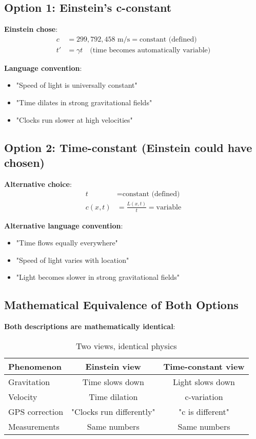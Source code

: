 \documentclass[12pt,a4paper]{article}
\begin{document}
	\subsection{Option 1: Einstein's c-constant}
	
	\textbf{Einstein chose}:
	\begin{align}
		c &= 299,792,458 \text{ m/s} = \text{constant (defined)} \\
		t' &= \gamma t \quad \text{(time becomes automatically variable)}
	\end{align}
	
	\textbf{Language convention}:
	\begin{itemize}
		\item "Speed of light is universally constant"
		\item "Time dilates in strong gravitational fields"
		\item "Clocks run slower at high velocities"
	\end{itemize}
	
	\subsection{Option 2: Time-constant (Einstein could have chosen)}
	
	\textbf{Alternative choice}:
	\begin{align}
		t &= \text{constant (defined)} \\
		c(x,t) &= \frac{L(x,t)}{t} = \text{variable}
	\end{align}
	
	\textbf{Alternative language convention}:
	\begin{itemize}
		\item "Time flows equally everywhere"
		\item "Speed of light varies with location"
		\item "Light becomes slower in strong gravitational fields"
	\end{itemize}
	
	\subsection{Mathematical Equivalence of Both Options}
	
	\textbf{Both descriptions are mathematically identical}:
	
	\begin{table}[htbp]
		\centering
		\begin{tabular}{|l|c|c|}
			\hline
			\textbf{Phenomenon} & \textbf{Einstein view} & \textbf{Time-constant view} \\
			\hline
			Gravitation & Time slows down & Light slows down \\
			Velocity & Time dilation & c-variation \\
			GPS correction & "Clocks run differently" & "c is different" \\
			Measurements & Same numbers & Same numbers \\
			\hline
		\end{tabular}
		\caption{Two views, identical physics}
	\end{table}
	
\end{document}
